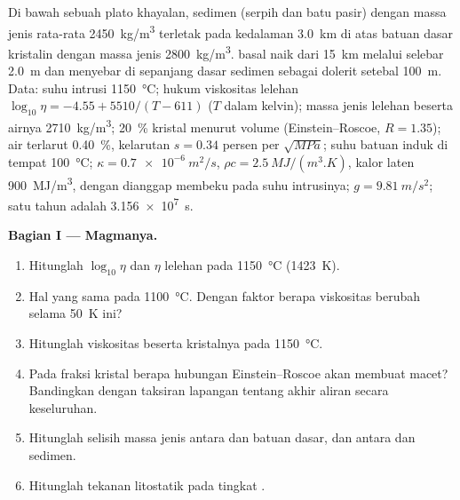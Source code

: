 \begin{problem}
\label{pb:b2:magma-emplacement:1}
Di bawah sebuah plato khayalan, sedimen (serpih dan batu pasir) dengan massa jenis rata-rata
\qty{2450}{kg/m^3} terletak pada kedalaman \qty{3.0}{km} di atas batuan dasar kristalin dengan
massa jenis \qty{2800}{kg/m^3}.  basal naik dari \qty{15}{km} melalui 
selebar \qty{2.0}{m} dan menyebar di sepanjang dasar sedimen sebagai  dolerit
setebal \qty{100}{m}. Data: suhu intrusi \qty{1150}{\celsius}; hukum viskositas
lelehan $\log_{10}\eta = -4.55 + 5510/(T - 611)$ ($T$ dalam kelvin); massa jenis
lelehan beserta airnya \qty{2710}{kg/m^3}; \qty{20}{\percent} kristal menurut volume
(Einstein--Roscoe, $R = 1.35$); air terlarut \qty{0.40}{\percent}, kelarutan
$s = 0.34$ persen per $\sqrt{\unit{MPa}}$; suhu batuan induk di tempat 
\qty{100}{\celsius}; $\kappa = \qty{0.7e-6}{m^2/s}$, $\rho c = \qty{2.5}{MJ/(m^3.K)}$,
kalor laten \qty{900}{MJ/m^3}, dengan  dianggap membeku pada suhu
intrusinya; $g = \qty{9.81}{m/s^2}$; satu tahun adalah \qty{3.156e7}{s}.

\medskip\noindent\textbf{Bagian I --- Magmanya.}
\begin{enumerate}
\item Hitunglah $\log_{10}\eta$ dan $\eta$ lelehan pada \qty{1150}{\celsius}
(\qty{1423}{K}).
\item Hal yang sama pada \qty{1100}{\celsius}. Dengan faktor berapa viskositas berubah selama
\qty{50}{K} ini?
\item Hitunglah viskositas  beserta kristalnya pada
\qty{1150}{\celsius}.
\item Pada fraksi kristal berapa hubungan Einstein--Roscoe akan membuat
 macet? Bandingkan dengan taksiran lapangan tentang akhir aliran secara keseluruhan.
\item Hitunglah selisih massa jenis antara  dan batuan dasar, dan
antara  dan sedimen.
\item Hitunglah tekanan litostatik pada tingkat .
\end{enumerate}


\end{problem}
